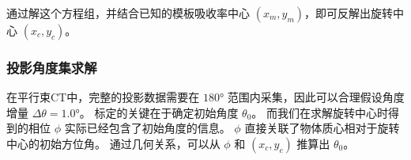 通过解这个方程组，并结合已知的模板吸收率中心 $(x_m,y_m)$，即可反解出旋转中心 $(x_c,y_c)$。

\subsubsection{投影角度集求解}

在平行束CT中，完整的投影数据需要在 $180°$ 范围内采集，因此可以合理假设角度增量 $\Delta\theta=1.0°$。
标定的关键在于确定初始角度 $\theta_0$。
而我们在求解旋转中心时得到的相位 $\phi$ 实际已经包含了初始角度的信息。
$\phi$ 直接关联了物体质心相对于旋转中心的初始方位角。
通过几何关系，可以从 $\phi$ 和 $(x_c,y_c)$ 推算出 $\theta_0$。  